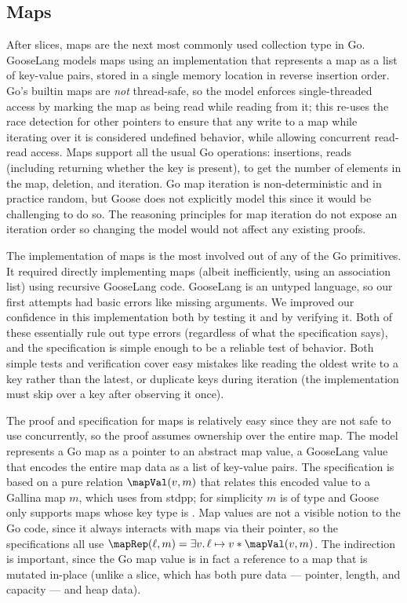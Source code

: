 \subsection{Maps}


After slices, maps are the next most commonly used collection type in
Go. GooseLang models maps using an implementation that represents a map as a
list of key-value pairs, stored in a single memory location in reverse insertion
order. Go's builtin maps are
\emph{not} thread-safe, so the model enforces single-threaded access by
marking the map as being read while reading from it; this re-uses the
race detection for other pointers to ensure that any write to a map while iterating
over it is considered
undefined behavior, while allowing concurrent read-read access. Maps
support all the usual Go operations: insertions, reads (including returning
whether the key is present),  to get the number of elements
in the map, deletion, and iteration. Go map iteration is
non-deterministic and in practice random, but Goose does not explicitly model this
since it would be challenging to do so. The reasoning
principles for map iteration do not expose an iteration order so changing the
model would not affect any existing proofs.

The implementation of maps is the most involved out of any of the Go
primitives. It required directly implementing maps (albeit
inefficiently, using an association list) using recursive GooseLang
code. GooseLang is an untyped language, so our first attempts had basic
errors like missing arguments. We improved our confidence in this
implementation both by testing it and by verifying it. Both of these
essentially rule out type errors (regardless of what the specification says),
and the specification is simple enough
to be a reliable test of behavior. Both simple tests and verification
cover easy mistakes like reading the oldest write to a key rather than
the latest, or duplicate keys during iteration (the implementation must
skip over a key after observing it once).

The proof and specification for maps is relatively easy since they are
not safe to use concurrently, so the proof assumes ownership over the entire
map. The model represents
a Go map as a pointer to an abstract map value, a GooseLang value
that encodes the entire map data as a list of key-value pairs. The
specification is based on a pure relation $\mapVal(v, m)$ that relates
this encoded value to a Gallina map $m$, which uses  from
stdpp; for simplicity $m$ is of type  and Goose only supports
maps whose key type is .
Map values are not a visible notion to the Go code, since
it always interacts with maps via their pointer, so the specifications
all use $\mapRep(\ell, m) = \exists v.\, \ell \mapsto v * \mapVal(v, m)$. The
indirection is important, since the Go map value
 is in fact a reference to a map that is
mutated in-place (unlike a slice, which has both pure data --- pointer,
length, and capacity --- and heap data).

